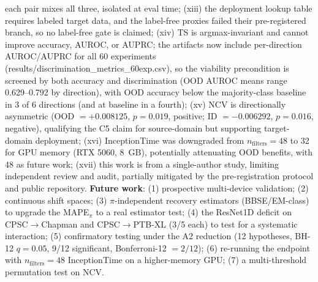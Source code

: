 \documentclass[review,12pt,nonatbib]{elsarticle}
\begin{document}
each pair mixes all three, isolated at eval time; (xiii) the deployment
lookup table requires labeled target data, and the label-free proxies
failed their pre-registered branch, so no label-free gate is claimed;
(xiv) TS is argmax-invariant and cannot improve accuracy, AUROC, or
AUPRC; the artifacts now include per-direction AUROC/AUPRC for all 60
experiments (results/discrimination\_metrics\_60exp.csv), so the
viability precondition is screened by both accuracy and discrimination
(OOD AUROC means range 0.629--0.792 by direction), with OOD accuracy
below the majority-class baseline in 3 of 6 directions (and at baseline
in a fourth);
(xv) NCV is directionally asymmetric (OOD $= +0.008125$, $p = 0.019$,
positive; ID $= -0.006292$, $p = 0.016$, negative), qualifying the C5
claim for source-domain but supporting target-domain deployment; (xvi)
InceptionTime was downgraded from $n_{\text{filters}}=48$ to 32 for GPU
memory (RTX 5060, 8~GB), potentially attenuating OOD benefits, with 48
as future work; (xvii) this work is from a single-author
study, limiting independent review and audit, partially mitigated by the
pre-registration protocol and public repository.  \textbf{Future work}:
(1) prospective multi-device validation; (2) continuous shift spaces;
(3) $\pi$-independent recovery estimators (BBSE/EM-class) to upgrade the
MAPE$_\pi$ to a real estimator test; (4) the ResNet1D deficit on
CPSC$\rightarrow$Chapman and CPSC$\rightarrow$PTB-XL (3/5 each) to test
for a systematic interaction; (5) confirmatory testing under the A2
reduction (12 hypotheses, BH-12 $q=0.05$, 9/12 significant,
Bonferroni-12 $=2/12$); (6) re-running the endpoint with
$n_{\text{filters}}=48$ InceptionTime on a higher-memory GPU; (7) a
multi-threshold permutation test on NCV.

\end{document}
